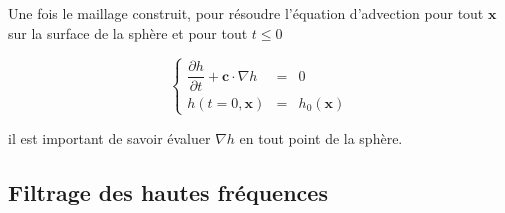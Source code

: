 Une fois le maillage construit, pour résoudre l'équation d'advection pour tout $\mathbf{x}$ sur la surface de la sphère et pour tout $t \leq 0$ 

\begin{equation}
  \left\{
  \begin{array}{rcl}
    \dfrac{\partial h}{\partial t} + \mathbf{c} \cdot \nabla h & = & 0 \\
    h(t=0, \mathbf{x}) & = & h_0(\mathbf{x})  
  \end{array}
  \right.
  \label{advection}
\end{equation}

il est important de savoir évaluer $\nabla h$ en tout point de la sphère.


\subsection{Filtrage des hautes fréquences}


